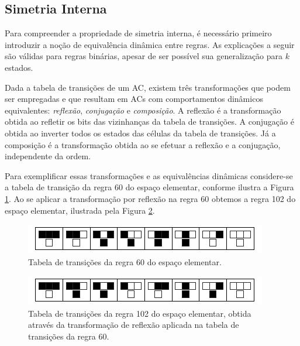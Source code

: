 \documentclass[12pt, a4paper]{article}
\begin{document}

\subsection{Simetria Interna}
Para compreender a propriedade de simetria interna, é necessário primeiro introduzir a noção de equivalência dinâmica entre regras. As explicações a seguir são válidas para regras binárias, apesar de ser possível sua generalização para $k$ estados.

Dada a tabela de transições de um AC, existem três transformações que podem ser empregadas e que resultam em ACs com comportamentos dinâmicos equivalentes: \textit{reflexão}, \textit{conjugação} e \textit{composição}. A reflexão é a transformação obtida ao refletir os bits das vizinhanças da tabela de transições. A conjugação é obtida ao inverter todos os estados das células da tabela de transições. Já a composição é a transformação obtida ao se efetuar a reflexão e a conjugação, independente da ordem.

Para exemplificar essas transformações e as equivalências dinâmicas considere-se a tabela de transição da regra 60 do espaço elementar, conforme ilustra a Figura \ref{fig:table60}. Ao se aplicar a transformação por reflexão na regra 60 obtemos a regra 102 do espaço elementar, ilustrada pela Figura \ref{fig:table102}.

	\begin{figure}[h!]
	  \centering
	  \includegraphics[width=.5\textwidth]{fig_ruleIcon60.png}
	  \caption{Tabela de transições da regra 60 do espaço elementar.}
	  \label{fig:table60}
	\end{figure}

	\begin{figure}[h!]
	  \centering
	  \includegraphics[width=.5\textwidth]{fig_ruleIcon102.png}
	  \caption{Tabela de transições da regra 102 do espaço elementar, obtida através da transformação de reflexão aplicada na tabela de transições da regra 60.}
	  \label{fig:table102}
	\end{figure}
\end{document}
